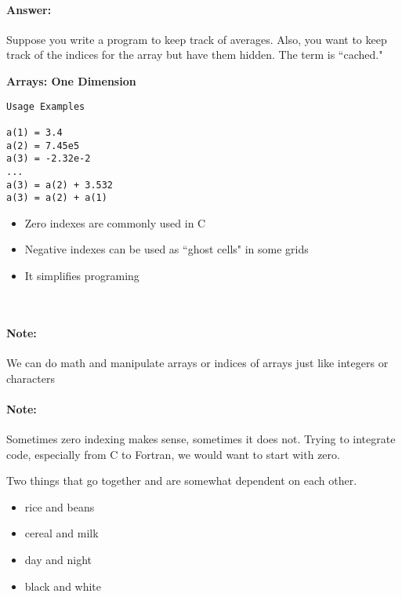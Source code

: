 \documentclass[11pt]{article}
\begin{document}
\paragraph{Answer:}	Suppose you write a program to keep track of averages. Also, you want to keep track of the indices for the array but have them hidden. The term is ``cached."
\vfill
\noindent
\begin{minipage}[t]{0.45\textwidth}
\bf{Arrays: One Dimension}
\begin{verbatim}
Usage Examples

a(1) = 3.4
a(2) = 7.45e5
a(3) = -2.32e-2
...
a(3) = a(2) + 3.532
a(3) = a(2) + a(1)
\end{verbatim}
	\end{minipage}
\begin{minipage}[t]{0.5\textwidth}
\begin{itemize}
	\item Zero indexes are commonly used in C
	\item Negative indexes can be used as ``ghost cells" in some grids
	\item It simplifies programing
\end{itemize}
\end{minipage}\\

\paragraph {Note:} We can do math and manipulate arrays or indices of arrays just like integers or characters

\paragraph {Note:} Sometimes zero indexing makes sense, sometimes it does not. Trying to integrate code, especially from C to Fortran, we would want to start with zero.\\
\vfill

\par Two things that go together and are somewhat dependent on each other.
\begin{itemize}
	\item rice and beans
	\item cereal and milk
	\item day and night
	\item black and white
\end{itemize}
\end{document}
